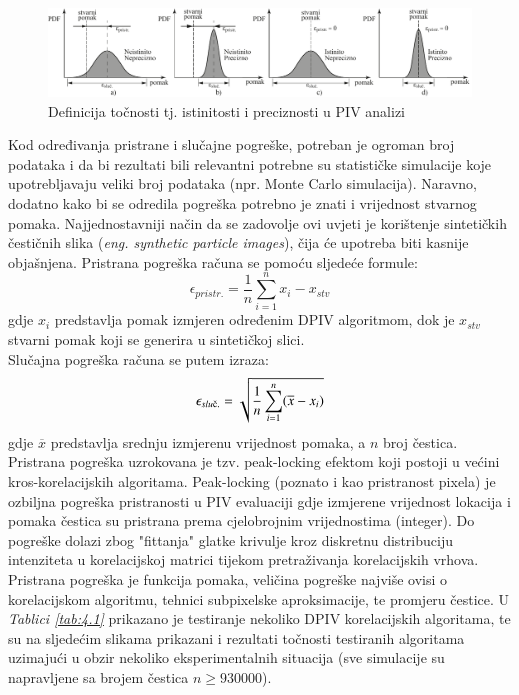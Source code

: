 \begin{figure}[h]  
	\centering
	\includegraphics[width=16cm]{./4_PIVNesigurnost/slika4_2.pdf} 
	\caption{Definicija točnosti tj. istinitosti i preciznosti u PIV analizi}
	\label{sl:4.2}
\end{figure}
\par
Kod određivanja pristrane i slučajne pogreške, potreban je ogroman broj podataka i da bi rezultati bili relevantni potrebne su statističke simulacije koje upotrebljavaju veliki broj podataka (npr. Monte Carlo simulacija). Naravno, dodatno kako bi se odredila pogreška potrebno je znati i vrijednost stvarnog pomaka. Najjednostavniji način da se zadovolje ovi uvjeti je korištenje sintetičkih čestičnih slika (\textit{eng. synthetic particle images}), čija će upotreba biti kasnije objašnjena.  Pristrana pogreška računa se pomoću sljedeće formule:
\begin{equation}
	\epsilon_{pristr.}=\frac{1}{n}\sum_{i=1}^{n}x_{i} - x_{stv}
	\label{eqn:4.1}
\end{equation}
gdje $x_{i}$ predstavlja pomak izmjeren određenim DPIV algoritmom, dok je $x_{stv}$ stvarni pomak koji se generira u sintetičkoj slici.\\
Slučajna pogreška računa se putem izraza:
\begin{equation}
	\epsilon_{slu\textup{č}.}=\sqrt{\frac{1}{n}\sum_{i=1}^{n}(\overline{x}-x_{i})}
	\label{eqn:4.2}
\end{equation}
gdje $\overline{x}$ predstavlja srednju izmjerenu vrijednost pomaka, a $n$ broj čestica. Pristrana pogreška uzrokovana je tzv. peak-locking efektom koji postoji u većini kros-korelacijskih algoritama. Peak-locking (poznato i kao pristranost pixela) je ozbiljna pogreška pristranosti u PIV evaluaciji gdje izmjerene vrijednost lokacija i pomaka čestica su pristrana prema cjelobrojnim vrijednostima (integer). Do pogreške dolazi zbog "fittanja" glatke krivulje kroz diskretnu distribuciju intenziteta u korelacijskoj matrici tijekom pretraživanja korelacijskih vrhova. Pristrana pogreška je funkcija pomaka, veličina pogreške najviše ovisi o korelacijskom algoritmu, tehnici subpixelske aproksimacije, te promjeru čestice. U \textit{Tablici \ref{tab:4.1}} prikazano je testiranje nekoliko DPIV korelacijskih algoritama, te su na sljedećim slikama prikazani i rezultati točnosti testiranih algoritama uzimajući u obzir nekoliko eksperimentalnih situacija \cite{thielicke2014_phd} (sve simulacije su napravljene sa brojem čestica $n\geq 930 000$).
